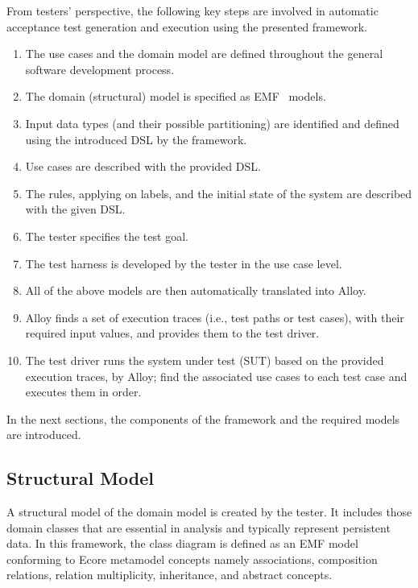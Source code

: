 From testers' perspective, the following key steps are involved in automatic acceptance test generation and execution using the presented framework.
\begin{enumerate}
	\item The use cases and the domain model are defined throughout the general software development process. 
	
	\item The domain (structural) model is specified as EMF~\cite{EMF} models. 
	
	\item Input data types (and their possible partitioning) are identified and defined using the introduced DSL by the framework. 
	
	\item Use cases are described with the provided DSL.
	
	\item The rules, applying on labels, and the initial state of the system are described with the given DSL.
	
	\item The tester specifies the test goal.
	
	\item The test harness is developed by the tester in the use case level.
	
	\item All of the above models are then automatically translated into Alloy.
	
	\item Alloy finds a set of execution traces (i.e., test paths or test cases), with their required input values, and provides them to the test driver.
	
	\item The test driver runs the system under test (SUT) based on the provided execution traces, by Alloy; find the associated use cases to each test case and executes them in order.
\end{enumerate}

In the next sections, the components of the framework and the required models are introduced. 

\subsection{Structural Model}
\label{sec:framework-overview-structure}
A structural model of the domain model is created by the tester. It includes those domain classes that are essential in analysis and typically represent persistent data. In this framework, the class diagram is defined as an EMF model conforming to Ecore metamodel concepts namely associations, composition relations, relation multiplicity, inheritance, and abstract concepts.
 
